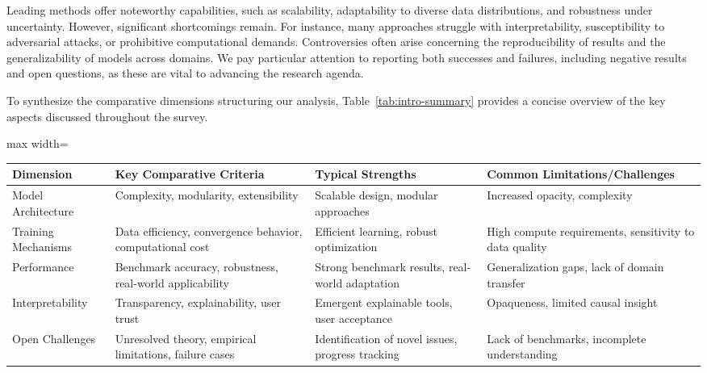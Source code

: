 \documentclass[sigconf]{acmart}
\begin{document}
Leading methods offer noteworthy capabilities, such as scalability, adaptability to diverse data distributions, and robustness under uncertainty. However, significant shortcomings remain. For instance, many approaches struggle with interpretability, susceptibility to adversarial attacks, or prohibitive computational demands. Controversies often arise concerning the reproducibility of results and the generalizability of models across domains. We pay particular attention to reporting both successes and failures, including negative results and open questions, as these are vital to advancing the research agenda.

To synthesize the comparative dimensions structuring our analysis, Table~\ref{tab:intro-summary} provides a concise overview of the key aspects discussed throughout the survey.

\begin{table*}[htbp]
\centering
\caption{Summary of comparative dimensions addressed in this survey, outlining major strengths and persistent challenges for principal AI/ML methods.}
\label{tab:intro-summary}
\begin{adjustbox}{max width=\textwidth}
\begin{tabular}{@{}llll@{}}
\toprule
Dimension          & Key Comparative Criteria                                                   & Typical Strengths                                  & Common Limitations/Challenges       \\
\midrule
Model Architecture & Complexity, modularity, extensibility                                      & Scalable design, modular approaches                & Increased opacity, complexity \\
Training Mechanisms& Data efficiency, convergence behavior, computational cost                  & Efficient learning, robust optimization            & High compute requirements, sensitivity to data quality \\
Performance        & Benchmark accuracy, robustness, real-world applicability                   & Strong benchmark results, real-world adaptation    & Generalization gaps, lack of domain transfer \\
Interpretability   & Transparency, explainability, user trust                                   & Emergent explainable tools, user acceptance        & Opaqueness, limited causal insight \\
Open Challenges    & Unresolved theory, empirical limitations, failure cases                    & Identification of novel issues, progress tracking  & Lack of benchmarks, incomplete understanding \\
\bottomrule
\end{tabular}
\end{adjustbox}
\end{table*}
\end{document}
